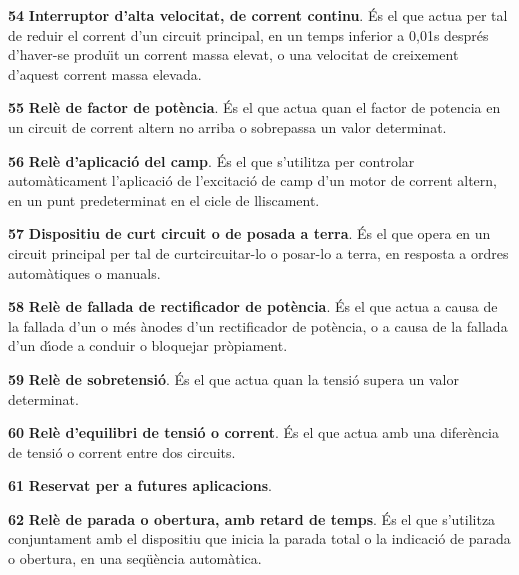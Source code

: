 \begin{multicols}{2}
\begin{list}{}
\item[\textbf{54}] 
\textbf{Interruptor d'alta velocitat, de corrent continu}. \'{E}s el que
actua per tal de reduir el corrent d'un circuit principal, en un
temps inferior a 0,01\unit{s} despr\'{e}s d'haver-se produ\"{\i}t un corrent
massa elevat, o una velocitat de creixement d'aquest corrent massa
elevada.

\item[\textbf{55}]  \textbf{Rel\`{e} de factor de pot\`{e}ncia}.
\'{E}s el que actua quan el factor de potencia en un circuit de corrent altern no arriba o
sobrepassa un valor determinat.

\item[\textbf{56}]  \textbf{Rel\`{e} d'aplicaci\'{o} del camp}.
\'{E}s el que s'utilitza per controlar autom\`{a}ticament l'aplicaci\'{o} de l'excitaci\'{o} de camp d'un
motor de corrent altern, en un punt predeterminat en el cicle de lliscament.

\item[\textbf{57}] 
\textbf{Dispositiu de curt circuit o de posada a terra}. \'{E}s el que
opera en un circuit principal per tal de curtcircuitar-lo  o
posar-lo a terra, en resposta a ordres autom\`{a}tiques o manuals.

\item[\textbf{58}]  \textbf{Rel\`{e} de
fallada de rectificador de pot\`{e}ncia}. \'{E}s el que actua a causa de la
fallada d'un o m\'{e}s \`{a}nodes d'un rectificador de pot\`{e}ncia, o a causa
de la fallada d'un d\'{\i}ode a conduir o bloquejar pr\`{o}piament.

\item[\textbf{59}]  \textbf{Rel\`{e} de sobretensi\'{o}}. \'{E}s el que
actua quan la tensi\'{o} supera un valor determinat.

\item[\textbf{60}]  \textbf{Rel\`{e} d'equilibri de
tensi\'{o} o corrent}. \'{E}s el que actua amb una difer\`{e}ncia de tensi\'{o} o
corrent entre dos circuits.

\item[\textbf{61}] \textbf{Reservat per a  futures aplicacions}.

\item[\textbf{62}]  \textbf{Rel\`{e} de
parada o obertura, amb retard de temps}. \'{E}s el que s'utilitza
conjuntament amb el dispositiu que inicia la parada total o la
indicaci\'{o} de parada o obertura, en una seq\"{u}\`{e}ncia autom\`{a}tica.


\end{list}
\end{multicols}
